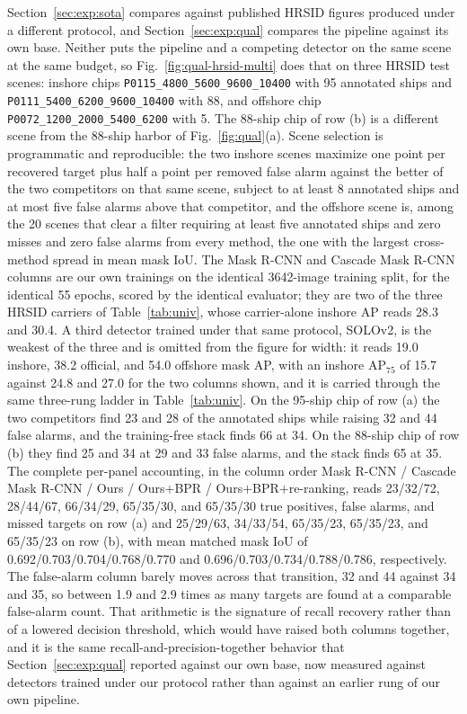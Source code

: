 Section~\ref{sec:exp:sota} compares against published HRSID figures produced under a different protocol, and Section~\ref{sec:exp:qual} compares the pipeline against its own base. Neither puts the pipeline and a competing detector on the same scene at the same budget, so Fig.~\ref{fig:qual-hrsid-multi} does that on three HRSID test scenes: inshore chips \texttt{P0115\_4800\_5600\_9600\_10400} with 95 annotated ships and \texttt{P0111\_5400\_6200\_9600\_10400} with 88, and offshore chip \texttt{P0072\_1200\_2000\_5400\_6200} with 5. The 88-ship chip of row (b) is a different scene from the 88-ship harbor of Fig.~\ref{fig:qual}(a). Scene selection is programmatic and reproducible: the two inshore scenes maximize one point per recovered target plus half a point per removed false alarm against the better of the two competitors on that same scene, subject to at least 8 annotated ships and at most five false alarms above that competitor, and the offshore scene is, among the 20 scenes that clear a filter requiring at least five annotated ships and zero misses and zero false alarms from every method, the one with the largest cross-method spread in mean mask IoU. The Mask R-CNN and Cascade Mask R-CNN columns are our own trainings on the identical 3642-image training split, for the identical 55 epochs, scored by the identical evaluator; they are two of the three HRSID carriers of Table~\ref{tab:univ}, whose carrier-alone inshore AP reads 28.3 and 30.4. A third detector trained under that same protocol, SOLOv2, is the weakest of the three and is omitted from the figure for width: it reads 19.0 inshore, 38.2 official, and 54.0 offshore mask AP, with an inshore AP$_{75}$ of 15.7 against 24.8 and 27.0 for the two columns shown, and it is carried through the same three-rung ladder in Table~\ref{tab:univ}. On the 95-ship chip of row (a) the two competitors find 23 and 28 of the annotated ships while raising 32 and 44 false alarms, and the training-free stack finds 66 at 34. On the 88-ship chip of row (b) they find 25 and 34 at 29 and 33 false alarms, and the stack finds 65 at 35. The complete per-panel accounting, in the column order Mask R-CNN / Cascade Mask R-CNN / Ours / Ours$+$BPR / Ours$+$BPR$+$re-ranking, reads 23/32/72, 28/44/67, 66/34/29, 65/35/30, and 65/35/30 true positives, false alarms, and missed targets on row (a) and 25/29/63, 34/33/54, 65/35/23, 65/35/23, and 65/35/23 on row (b), with mean matched mask IoU of 0.692/0.703/0.704/0.768/0.770 and 0.696/0.703/0.734/0.788/0.786, respectively. The false-alarm column barely moves across that transition, 32 and 44 against 34 and 35, so between 1.9 and 2.9 times as many targets are found at a comparable false-alarm count. That arithmetic is the signature of recall recovery rather than of a lowered decision threshold, which would have raised both columns together, and it is the same recall-and-precision-together behavior that Section~\ref{sec:exp:qual} reported against our own base, now measured against detectors trained under our protocol rather than against an earlier rung of our own pipeline.

